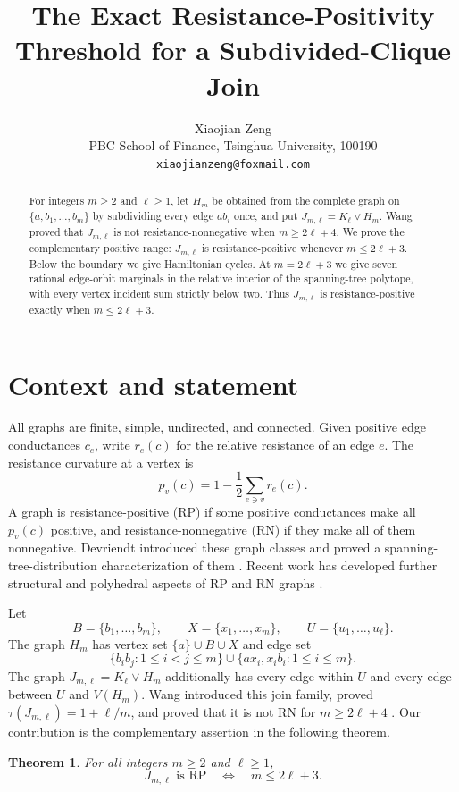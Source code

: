 \documentclass[11pt]{article}
\title{The Exact Resistance-Positivity Threshold for a Subdivided-Clique Join}
\author{Xiaojian Zeng\\
PBC School of Finance, Tsinghua University, 100190\\
\texttt{xiaojianzeng@foxmail.com}}
\date{}
\newtheorem{theorem}{Theorem}
\newcommand{\RP}{\mathrm{RP}}
\newcommand{\RN}{\mathrm{RN}}
\begin{document}
\maketitle

\begin{abstract}
For integers $m\geq2$ and $\ell\geq1$, let $H_m$ be obtained from the
complete graph on $\{a,b_1,\ldots,b_m\}$ by subdividing every edge $ab_i$
once, and put $J_{m,\ell}=K_\ell\vee H_m$.  Wang proved that
$J_{m,\ell}$ is not resistance-nonnegative when $m\geq2\ell+4$.
We prove the complementary positive range: $J_{m,\ell}$ is
resistance-positive whenever $m\leq2\ell+3$.  Below the boundary we give
Hamiltonian cycles.  At $m=2\ell+3$ we give seven rational edge-orbit
marginals in the relative interior of the spanning-tree polytope, with every
vertex incident sum strictly below two.  Thus
$J_{m,\ell}$ is resistance-positive exactly when $m\leq2\ell+3$.
\end{abstract}

\section{Context and statement}

All graphs are finite, simple, undirected, and connected.  Given positive
edge conductances $c_e$, write $r_e(c)$ for the relative resistance of an
edge $e$.  The resistance curvature at a vertex is
\[
 p_v(c)=1-\frac12\sum_{e\ni v}r_e(c).
\]
A graph is resistance-positive (\(\RP\)) if some positive conductances make
all $p_v(c)$ positive, and resistance-nonnegative (\(\RN\)) if they make all
of them nonnegative.  Devriendt introduced these graph classes and proved a
spanning-tree-distribution characterization of them
\cite{Devriendt2026}.  Recent work has developed further structural and
polyhedral aspects of \(\RP\) and \(\RN\) graphs
\cite{AgrahariEtAl2026}.

Let
\[
 B=\{b_1,\ldots,b_m\},\qquad X=\{x_1,\ldots,x_m\},
 \qquad U=\{u_1,\ldots,u_\ell\}.
\]
The graph $H_m$ has vertex set $\{a\}\cup B\cup X$ and edge set
\[
 \{b_ib_j:1\leq i<j\leq m\}\cup
 \{ax_i,x_ib_i:1\leq i\leq m\}.
\]
The graph $J_{m,\ell}=K_\ell\vee H_m$ additionally has every edge within
$U$ and every edge between $U$ and $V(H_m)$.  Wang introduced this join
family, proved $\tau(J_{m,\ell})=1+\ell/m$, and proved that it is not \(\RN\)
for $m\geq2\ell+4$ \cite[Propositions 15--16]{Wang2026}.
Our contribution is the complementary assertion in the following theorem.

\begin{theorem}\label{thm:main}
For all integers $m\geq2$ and $\ell\geq1$,
\[
 J_{m,\ell}\text{ is \(\RP\)}\quad\Longleftrightarrow\quad
 m\leq2\ell+3.
\]
\end{theorem}
\end{document}
